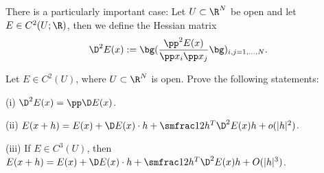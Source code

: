 There is a particularly important case: Let $U \subset \R^N$ be open
and let $E \in C^2(U; \R)$, then we define the Hessian matrix
\begin{displaymath}
  \D^2 E(x) := \bg( \frac{\pp^2 E(x)}{\pp x_i \pp x_j}
  \bg)_{i, j = 1, \dots, N}.
\end{displaymath}

\begin{exercise}
  Let $E \in C^2(U)$, where $U \subset \R^N$ is open. Prove the
  following statements:

  (i) $\D^2 E(x) = \pp \D E(x)$.

  (ii) $E(x+h) = E(x) + \D E(x) \cdot h + \smfrac12 h^T \D^2 E(x) h +
  o(|h|^2)$.

  (iii) If $E \in C^3(U)$, then $E(x+h) = E(x) + \D E(x) \cdot h +
  \smfrac12 h^T \D^2 E(x) h + O(|h|^3)$.
\end{exercise}
